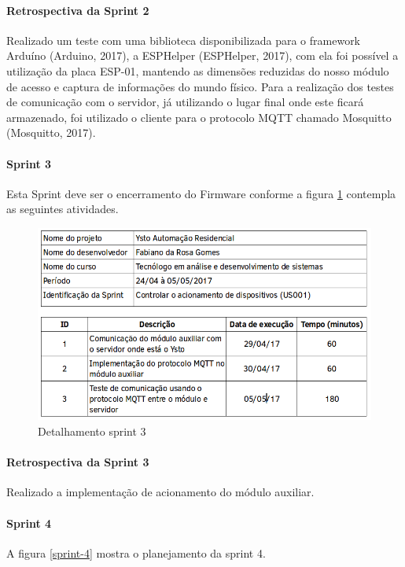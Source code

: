 \paragraph{Retrospectiva da Sprint 2} Realizado um teste com uma biblioteca disponibilizada para o framework Arduíno (Arduino, 2017), a ESPHelper (ESPHelper, 2017), com ela foi possível a utilização da placa ESP-01, mantendo as dimensões reduzidas do nosso módulo de acesso e captura de informações do mundo físico. Para a realização dos testes de comunicação com o servidor, já utilizando o lugar final onde este ficará armazenado, foi utilizado o cliente para o protocolo MQTT chamado Mosquitto (Mosquitto, 2017).

\paragraph{Sprint 3} Esta Sprint deve ser o encerramento do Firmware conforme a figura \ref{sprint-3} contempla as seguintes atividades.

\begin{figure}[H]
\caption{\label{sprint-3} Detalhamento sprint 3}
\includegraphics[scale=0.5]{img/sprint-2.png}
\end{figure}

\paragraph{Retrospectiva da Sprint 3} Realizado a implementação de acionamento do módulo auxiliar.

\paragraph{Sprint 4} A figura \ref{sprint-4} mostra o planejamento da sprint 4.

